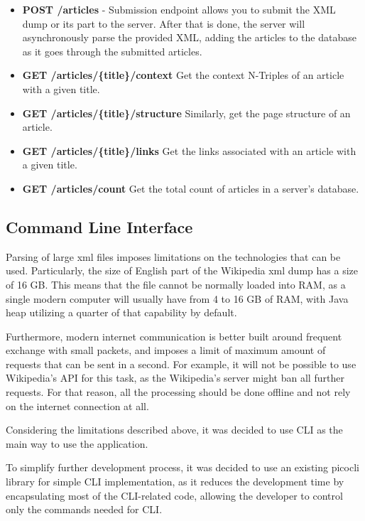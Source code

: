 \documentclass[thesis=M,english,hidelinks]{FITthesis}[2019/12/23]
\begin{document}
\begin{itemize}
	\item \textbf{POST /articles} - Submission endpoint allows you to submit the XML dump or its part to the server. After that is done, the server will asynchronously parse the provided XML, adding the articles to the database as it goes through the submitted articles.
	\item \textbf{GET /articles/\{title\}/context} Get the context N-Triples of an article with a given title.
	\item \textbf{GET /articles/\{title\}/structure} Similarly, get the page structure of an article.
	\item \textbf{GET /articles/\{title\}/links} Get the links associated with an article with a given title.
	\item \textbf{GET /articles/count} Get the total count of articles in a server's database.
\end{itemize}

\subsection{Command Line Interface}

Parsing of large xml files imposes limitations on the technologies that can be used. Particularly, the size of English part of the Wikipedia xml dump has a size of 16 GB. This means that the file cannot be normally loaded into \gls{RAM}, as a single modern computer will usually have from 4 to 16 GB of \gls{RAM}, with Java heap utilizing a quarter of that capability by default. 

Furthermore, modern internet communication is better built around frequent exchange with small packets, and imposes a limit of maximum amount of requests that can be sent in a second. For example, it will not be possible to use Wikipedia's API for this task, as the Wikipedia's server might ban all further requests. For that reason, all the processing should be done offline and not rely on the internet connection at all.

Considering the limitations described above, it was decided to use \gls{CLI} as the main way to use the application. 

To simplify further development process, it was decided to use an existing picocli library for simple CLI implementation, as it reduces the development time by encapsulating most of the CLI-related code, allowing the developer to control only the commands needed for CLI.
\end{document}

